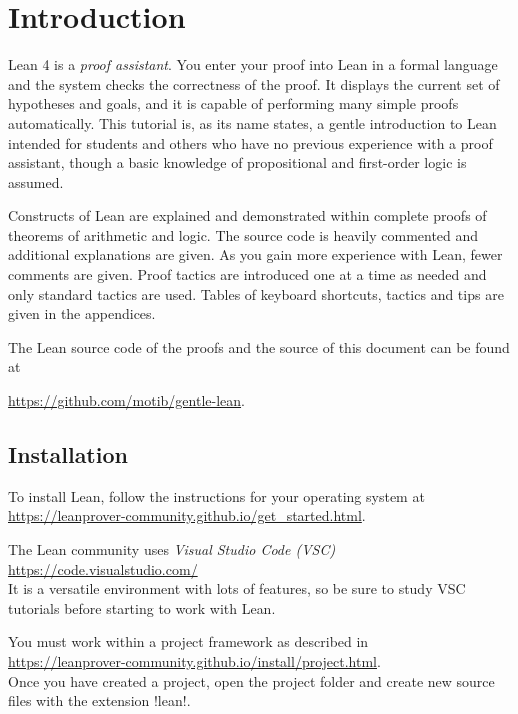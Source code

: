 
\section{Introduction}

Lean 4 is a \emph{proof assistant}. You enter your proof into Lean in a formal language and the system checks the correctness of the proof. It displays the current set of hypotheses and goals, and it is capable of performing many simple proofs automatically. This tutorial is, as its name states, a gentle introduction to Lean intended for students and others who have no previous experience with a proof assistant, though a basic knowledge of propositional and first-order logic is assumed.

Constructs of Lean are explained and demonstrated within complete proofs of theorems of arithmetic and logic. The source code is heavily commented and additional explanations are given. As you gain more experience with Lean, fewer comments are given. Proof tactics are introduced one at a time as needed and only standard tactics are used. Tables of keyboard shortcuts, tactics and tips are given in the appendices.

The Lean source code of the proofs and the \XeLaTeX{} source of this document can be found at

\indnt{}\url{https://github.com/motib/gentle-lean}.

\subsection*{Installation}

To install Lean, follow the instructions for your operating system at\\
\indnt\url{https://leanprover-community.github.io/get_started.html}.

The Lean community uses \emph{Visual Studio Code (VSC)}\\
\indnt{}\url{https://code.visualstudio.com/}\\
It is a versatile environment with lots of features, so be sure to study VSC tutorials before starting to work with Lean.

You must work within a project framework as described in\\ \indnt\url{https://leanprover-community.github.io/install/project.html}.\\ Once you have created a project, open the project folder and create new source files with the extension !lean!.

